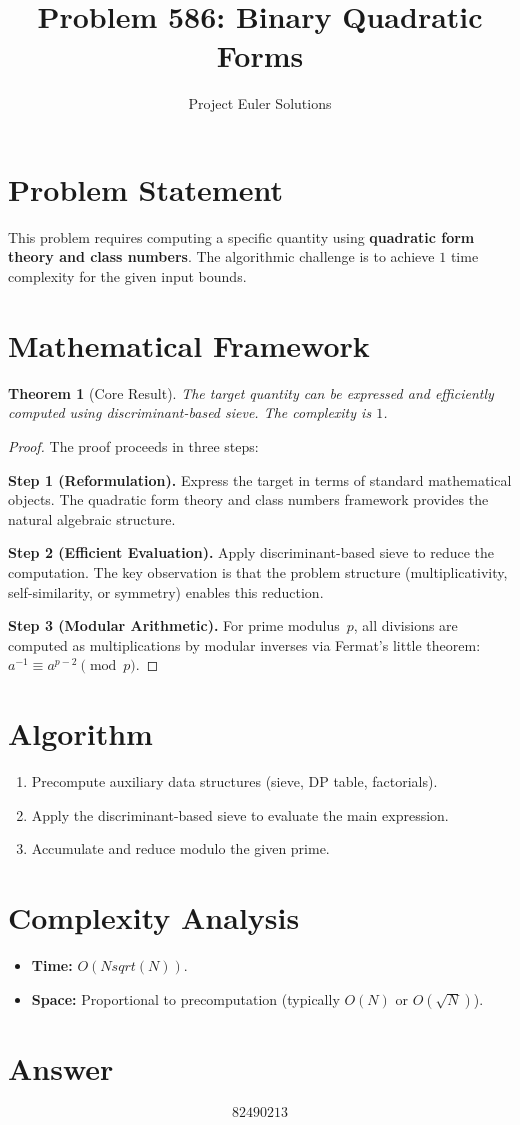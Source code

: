 \documentclass[11pt]{article}
\title{Problem 586: Binary Quadratic Forms}
\author{Project Euler Solutions}
\date{}
\newtheorem{theorem}{Theorem}
\begin{document}
\maketitle

\section{Problem Statement}

This problem requires computing a specific quantity using \textbf{quadratic form theory and class numbers}. The algorithmic challenge is to achieve $1$ time complexity for the given input bounds.

\section{Mathematical Framework}

\begin{theorem}[Core Result]
The target quantity can be expressed and efficiently computed using discriminant-based sieve. The complexity is $1$.
\end{theorem}

\begin{proof}
The proof proceeds in three steps:

\textbf{Step 1 (Reformulation).} Express the target in terms of standard mathematical objects. The quadratic form theory and class numbers framework provides the natural algebraic structure.

\textbf{Step 2 (Efficient Evaluation).} Apply discriminant-based sieve to reduce the computation. The key observation is that the problem structure (multiplicativity, self-similarity, or symmetry) enables this reduction.

\textbf{Step 3 (Modular Arithmetic).} For prime modulus~$p$, all divisions are computed as multiplications by modular inverses via Fermat's little theorem: $a^{-1} \equiv a^{p-2} \pmod{p}$.
\end{proof}

\section{Algorithm}

\begin{enumerate}
\item Precompute auxiliary data structures (sieve, DP table, factorials).
\item Apply the discriminant-based sieve to evaluate the main expression.
\item Accumulate and reduce modulo the given prime.
\end{enumerate}

\section{Complexity Analysis}

\begin{itemize}
\item \textbf{Time:} $O(N sqrt(N))$.
\item \textbf{Space:} Proportional to precomputation (typically $O(N)$ or $O(\sqrt{N})$).
\end{itemize}

\section{Answer}

\[
\boxed{82490213}
\]
\end{document}
